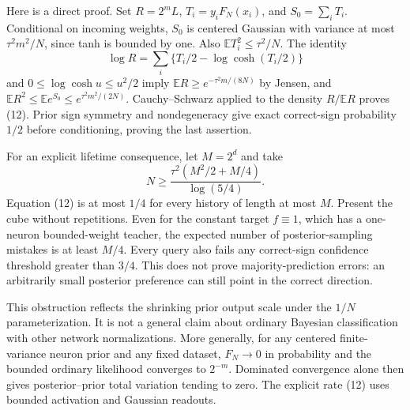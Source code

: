 \documentclass[11pt]{article}
\newcommand{\E}{\mathbb E}
\begin{document}
Here is a direct proof. Set $R=2^mL$, $T_i=y_iF_N(x_i)$, and
$S_0=\sum_iT_i$. Conditional on incoming weights, $S_0$ is centered
Gaussian with variance at most $\tau^2m^2/N$, since tanh is bounded
by one. Also $\E T_i^2\le\tau^2/N$. The identity
\[
 \log R=\sum_i\{T_i/2-\log\cosh(T_i/2)\}
\]
and $0\le\log\cosh u\le u^2/2$ imply
$\E R\ge e^{-\tau^2m/(8N)}$ by Jensen, and
$\E R^2\le\E e^{S_0}\le e^{\tau^2m^2/(2N)}$.
Cauchy--Schwarz applied to the density $R/\E R$ proves (12).
Prior sign symmetry and nondegeneracy give exact correct-sign
probability $1/2$ before conditioning, proving the last assertion.

For an explicit lifetime consequence, let $M=2^d$ and take
\[
 N\ge\frac{\tau^2(M^2/2+M/4)}{\log(5/4)}.
\]
Equation (12) is at most $1/4$ for every history of length at most
$M$. Present the cube without repetitions. Even for the constant target
$f\equiv1$, which has a one-neuron bounded-weight teacher, the expected
number of posterior-sampling mistakes is at least $M/4$.
Every query also fails any correct-sign confidence threshold greater
than $3/4$. This does not prove majority-prediction errors: an arbitrarily
small posterior preference can still point in the correct direction.

This obstruction reflects the shrinking prior output scale under the
$1/N$ parameterization. It is not a general claim about ordinary Bayesian
classification with other network normalizations. More generally, for
any centered finite-variance neuron prior and any fixed dataset,
$F_N\to0$ in probability and the bounded ordinary likelihood converges
to $2^{-m}$. Dominated convergence alone then gives posterior--prior
total variation tending to zero. The explicit rate (12) uses bounded
activation and Gaussian readouts.
\end{document}
